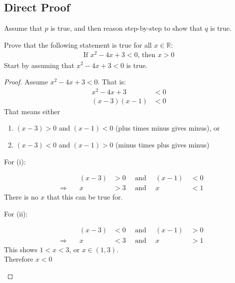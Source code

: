 \documentclass[../notes.tex]{subfiles}
\begin{document}
			\subsection{Direct Proof}
				Assume that $p$ is true, and then reason step-by-step to show that $q$ is true.
				\begin{example}
					Prove that the following statement is true for all $x \in \mathbb{R}$:
					\begin{align*}
						\text{If } x^{2} - 4x + 3 < 0 \text{, then } x > 0
					\end{align*}
					Start by assuming that $x^{2} - 4x + 3 < 0$ is true.
					\begin{proof}
						Assume $x^{2} - 4x + 3 < 0$. That is:
						\begin{align*}
							x^{2} - 4x + 3 &< 0\\
							(x - 3)(x - 1) &< 0 \tag*{(by factorisation)}
						\end{align*}
						That means either 
							\begin{enumerate}[label=(\roman*)]
								\item $(x - 3) > 0$ and $(x - 1) < 0$ (plus times minus gives minus), or
								\item $(x - 3) < 0$ and $(x - 1) > 0$ (minus times plus gives minus)
							\end{enumerate}
						For (i):
						\begin{adjustwidth}{1cm}{}
							\begin{alignat*}{3}
								& & (x - 3) &> 0 \quad \text{ and }\quad  (x - 1) \: &< 0\\
								& \Rightarrow \quad & x &> 3 \quad \text{ and } \quad x &< 1
							\end{alignat*}
							There is no $x$ that this can be true for.
						\end{adjustwidth}
						For (ii):
						\begin{adjustwidth}{1cm}{}
							\begin{alignat*}{3}
								& & (x - 3) &< 0 \quad \text{ and }\quad  (x - 1) \: &> 0\\
								& \Rightarrow \quad & x &< 3 \quad \text{ and } \quad x &> 1
							\end{alignat*}
							This shows $1 < x < 3$, or $x \in (1, 3)$.\\
							Therefore $x < 0$ \qedhere
						\end{adjustwidth}
					\end{proof}
				\end{example}
			\pagebreak
\end{document}
